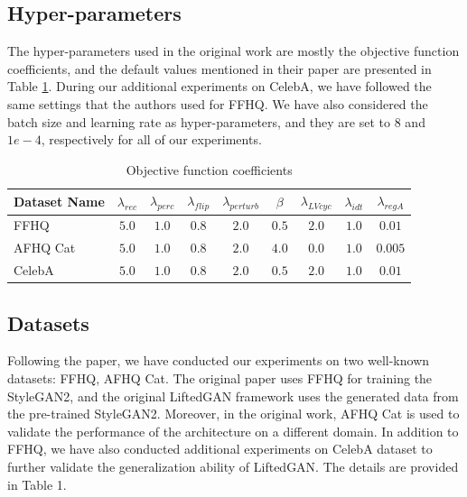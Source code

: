 \subsection{Hyper-parameters}

The hyper-parameters used in the original work are mostly the objective function coefficients, and the default values mentioned in their paper are presented in Table \ref{tab:hyperparams}. During our additional experiments on CelebA, we have followed the same settings that the authors used for FFHQ. 
We have also considered the batch size and learning rate as hyper-parameters, and they are set to $8$ and $1e-4$, respectively for all of our experiments.

\begin{table}[h!]
\centering
\caption{Objective function coefficients}
\begin{tabular}{|l|c|c|c|c|c|c|c|c|}
\hline
\multicolumn{1}{|c|}{\textbf{Dataset Name}} & $\lambda_{rec}$ & $\lambda_{perc}$ & $\lambda_{flip}$ & $\lambda_{perturb}$ & $\beta$ & $\lambda_{LVcyc}$ & $\lambda_{idt}$ & $\lambda_{regA}$ \\ \hline
FFHQ                                        & $5.0$       & $1.0$      & $0.8$ &  $2.0$ & $0.5$ &  $2.0$ & $1.0$  & $0.01$      \\ \hline
AFHQ Cat                                    & $5.0$       & $1.0$      & $0.8$ &  $2.0$ & $4.0$ &  $0.0$ & $1.0$  & $0.005$  \\ \hline
CelebA                                      & $5.0$       & $1.0$      & $0.8$ &  $2.0$ & $0.5$ &  $2.0$ & $1.0$  & $0.01$            \\ \hline
\end{tabular}
\label{tab:hyperparams}
\end{table}

\subsection{Datasets}
Following the paper, we have conducted our experiments on two well-known datasets: FFHQ, AFHQ Cat. The original paper uses FFHQ for training the StyleGAN2, and the original LiftedGAN framework uses the generated data from the pre-trained StyleGAN2. Moreover, in the original work, AFHQ Cat is used to validate the performance of the architecture on a different domain. In addition to FFHQ, we have also conducted additional experiments on CelebA dataset to further validate the generalization ability of LiftedGAN. The details are provided in Table 1.

